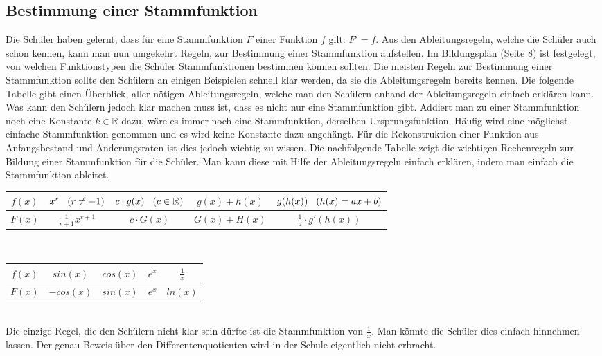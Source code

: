 \documentclass[a4paper]{article}
\begin{document}
\subsection{Bestimmung einer Stammfunktion}
Die Schüler haben gelernt, dass für eine Stammfunktion $F$ einer Funktion $f$ gilt: $F' = f$. Aus den Ableitungsregeln, welche die Schüler auch schon kennen, kann man nun umgekehrt Regeln, zur Bestimmung einer Stammfunktion aufstellen. Im Bildungsplan (Seite 8) ist festgelegt, von welchen Funktionstypen die Schüler Stammfunktionen bestimmen können sollten. Die meisten Regeln zur Bestimmung einer Stammfunktion sollte den Schülern an einigen Beispielen schnell klar werden, da sie die Ableitungsregeln bereits kennen. Die folgende Tabelle gibt einen Überblick, aller nötigen Ableitungsregeln, welche man den Schülern anhand der Ableitungsregeln einfach erklären kann. Was kann den Schülern jedoch klar machen muss ist, dass es nicht nur eine Stammfunktion gibt. Addiert man zu einer Stammfunktion noch eine Konstante $k \in \mathbb{R}$ dazu, wäre es immer noch eine Stammfunktion, derselben Ursprungsfunktion. Häufig wird eine möglichst einfache Stammfunktion genommen und es wird keine Konstante dazu angehängt. Für die Rekonstruktion einer Funktion aus Anfangsbestand und Änderungsraten ist dies jedoch wichtig zu wissen. Die nachfolgende Tabelle zeigt die wichtigen Rechenregeln zur Bildung einer Stammfunktion für die Schüler. Man kann diese mit Hilfe der Ableitungsregeln einfach erklären, indem man einfach die Stammfunktion ableitet.  
\vspace{1em} \\
\begin{tabular}{|c|c|c|c|c|}
\hline
$f(x)$ & $x^r \hspace{0.3 cm} (r \neq -1)$ & $c \cdot g(x) \hspace{0.3 cm} (c \in \mathbb{R})$ & $g(x) + h(x)$ & $g(h(x)) \hspace{0.3 cm} (h(x) = ax + b)$\\
\hline
$F(x)$ & $\frac{1}{r+1}x^{r+1}$ & $c \cdot G(x)$ & $G(x) + H(x)$ & $\frac{1}{a} \cdot g'(h(x))$ \\
\hline
\end{tabular}
\vspace{1 em} \\
\begin{tabular}{|c|c|c|c|c|}
\hline
$f(x)$ & $sin(x)$ & $cos(x)$ & $e^x$ & $\frac{1}{x}$\\
\hline
$F(x)$ & $-cos(x)$ & $sin(x)$ & $e^x$ & $ln(x)$ \\
\hline
\end{tabular}
\vspace{1 em} \\
Die einzige Regel, die den Schülern nicht klar sein dürfte ist die Stammfunktion von $\frac{1}{x}$. Man könnte die Schüler dies einfach hinnehmen lassen. Der genau Beweis über den Differentenquotienten wird in der Schule eigentlich nicht erbracht. 
\end{document}
